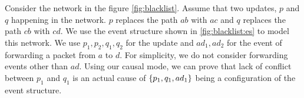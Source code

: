 \begin{example}

Consider the network in the figure \ref{fig:blacklist}.
Assume that two updates, $p$ and $q$ happening in the network.
$p$ replaces the path $ab$ with $ac$ and $q$ replaces
the path $cb$ with $cd$.
We use the event structure shown in \ref{fig:blacklist:es}
to model this network.
We use $p_1,p_2,q_1,q_2$ for the update and 
$ad_1,ad_2$ for the event of forwarding a packet from $a$
to $d$.
For simplicity, we do not consider forwarding events 
other than $ad$.
Using our causal mode, we can prove that lack of conflict
between $p_1$ and $q_1$ is an actual cause of 
$\{p_1,q_1,ad_1\}$ being a configuration of the event structure.
\end{example}